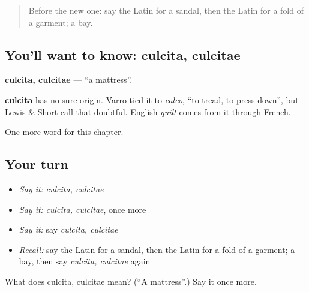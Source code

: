 \label{lesson:LA-C225-culcita}



\begin{quote}
Before the new one: say the Latin for a sandal, then the Latin for a fold of a garment; a bay.
\end{quote}

\subsection*{You'll want to know: culcita, culcitae}
\textbf{culcita, culcitae} — \textquotedblleft{}a mattress\textquotedblright{}.

\begin{cousinweb}
\textbf{culcita} has no sure origin. Varro tied it to \emph{calcō}, \textquotedblleft{}to tread, to press down\textquotedblright{}, but Lewis \& Short call that doubtful. English \emph{quilt} comes from it through French.
\end{cousinweb}

\begin{grammarlens}[title={What you've built}]
One more word for this chapter.
\end{grammarlens}

\subsection*{Your turn}
\begin{itemize}
\raggedright
  \item \emph{Say it:} \emph{culcita, culcitae}
  \item \emph{Say it:} \emph{culcita, culcitae}, once more
  \item \emph{Say it:} say \emph{culcita, culcitae}
  \item \emph{Recall:} say the Latin for a sandal, then the Latin for a fold of a garment; a bay, then say \emph{culcita, culcitae} again
\end{itemize}

\begin{tcolorbox}[breakable,colback=teal!4,colframe=teal!35!black,title={Before you move on}]
What does culcita, culcitae mean? (\textquotedblleft{}A mattress\textquotedblright{}.) Say it once more.
\end{tcolorbox}
